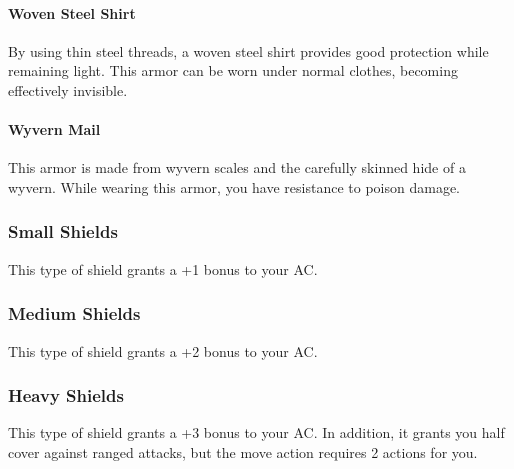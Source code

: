     \paragraph{Woven Steel Shirt}
        By using thin steel threads, a woven steel shirt provides good protection while remaining light.
        This armor can be worn under normal clothes, becoming effectively invisible.
    \paragraph{Wyvern Mail}
        This armor is made from wyvern scales and the carefully skinned hide of a wyvern.
        While wearing this armor, you have resistance to poison damage.
\newpage
\subsubsection{Small Shields} \label{ssec::smallshields}
This type of shield grants a +1 bonus to your AC.

\subsubsection{Medium Shields} \label{ssec::mediumshields}
This type of shield grants a +2 bonus to your AC.

\subsubsection{Heavy Shields} \label{ssec::heavyshields}
This type of shield grants a +3 bonus to your AC.
In addition, it grants you half cover against ranged attacks, but the move action requires 2 actions for you.
